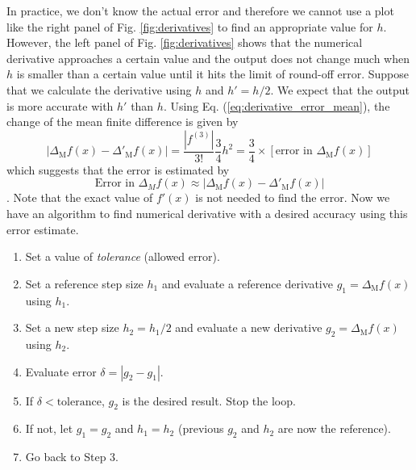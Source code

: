 In practice, we don't know the actual error and therefore we cannot use a plot like the right panel of Fig. \ref{fig:derivatives} to find an appropriate value for $h$.  However, the left panel of Fig. \ref{fig:derivatives} shows that the numerical derivative approaches a certain value and the output does not change much when $h$ is smaller than a certain value until it hits the limit of round-off error.
Suppose that we calculate the derivative using $h$ and $h'=h/2$.  We expect that the output is more accurate with $h'$ than $h$. Using Eq. (\ref{eq:derivative_error_mean}), the change of the mean finite difference is given by
\begin{equation}
\left | \Delta_\text{M} f(x) - \Delta'_\text{M} f(x) \right | = \frac{|f^{(3)}|}{3!} \frac{3}{4} h^2 = \frac{3}{4} \times  \left [ \text{error in } \Delta_\text{M} f(x) \right ]
\end{equation}
which suggests that the error is estimated by
\begin{equation}
\text{Error in }\Delta_M f(x) \approx  \left | \Delta_\text{M} f(x) - \Delta'_\text{M} f(x) \right |  
\end{equation}. 
Note that the exact value of $f'(x)$ is not needed to find the error.
Now we have an algorithm to find numerical derivative with a desired accuracy using this error estimate.  

\bigskip

\begin{myalgobox}
\label{algo:derivative-auto}

\medskip
\begin{enumerate}
\item Set a value of \textit{tolerance} (allowed error).
\item Set a reference step size $h_1$ and evaluate a reference derivative $g_1 = \Delta_\text{M} f(x)$ using $h_1$.
\item Set a new step size $h_2=h_1/2$ and evaluate a new derivative $g_2 = \Delta_\text{M} f(x)$ using $h_2$.
\item Evaluate error $\delta = |g_2-g_1|$.
\item If $\delta < \text{tolerance}$, $g_2$ is the desired result.  Stop the loop.
\item If not, let $g_1=g_2$ and $h_1=h_2$ (previous $g_2$ and $h_2$ are now the reference).
\item Go back to Step 3.
\end{enumerate}
\end{myalgobox}


